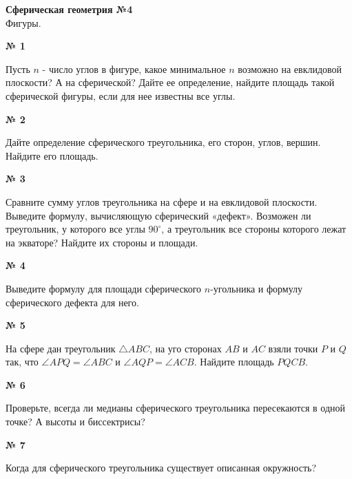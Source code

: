 


    \begin{center}
        \textbf{Сферическая геометрия №4}\\
        Фигуры.
    \end{center}

    \begin{center}
        \textbf{№ 1}
    \end{center}
    Пусть $n$ - число углов в фигуре, какое минимальное $n$ возможно на евклидовой плоскости?
    А на сферической?
    Дайте ее определение, найдите площадь такой сферической фигуры, если для нее известны все углы.

    \begin{center}
        \textbf{№ 2}
    \end{center}

    Дайте определение сферического треугольника, его сторон, углов, вершин.
    Найдите его площадь.

    \begin{center}
        \textbf{№ 3}
    \end{center}

    Сравните сумму углов треугольника на сфере и на евклидовой плоскости.
    Выведите формулу, вычисляющую сферический «дефект».
    Возможен ли треугольник, у которого все углы $90^\circ$,
    а треугольник все стороны которого лежат на экваторе?
    Найдите их стороны и площади.

    \begin{center}
        \textbf{№ 4}
    \end{center}

    Выведите формулу для площади сферического $n$-угольника и формулу сферического дефекта для него.

    \begin{center}
        \textbf{№ 5}
    \end{center}
    На сфере дан треугольник $\triangle ABC$, на уго сторонах $AB$ и $AC$ взяли
    точки $P$ и $Q$ так, что $\angle APQ = \angle ABC$ и $\angle AQP = \angle ACB$.
    Найдите площадь $PQCB$.

    \begin{center}
        \textbf{№ 6}
    \end{center}
    Проверьте, всегда ли медианы сферического треугольника пересекаются в одной точке?
    А высоты и биссектрисы?

    \begin{center}
        \textbf{№ 7}
    \end{center}
    Когда для сферического треугольника существует описанная окружность?

